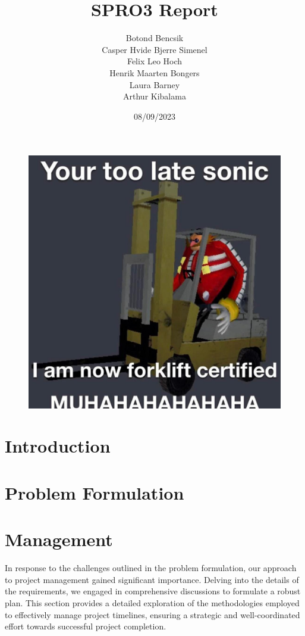 \documentclass[11pt,table]{article}
\title{SPRO3 Report}
\date{08/09/2023}
\author{Botond Bencsik\\Casper Hvide Bjerre Simenel\\Felix Leo Hoch\\Henrik Maarten Bongers\\Laura Barney\\Arthur Kibalama}
\begin{document}
\maketitle
\begin{figure}[H]
    \includegraphics[width=\textwidth]{forklift_m.jpg}
\end{figure}
\newpage
\tableofcontents
\newpage
\section{Introduction}
      
\section{Problem Formulation}
    
    
    

    
    
\section{Management}
    In response to the challenges outlined in the problem formulation, our approach
    to project management gained significant importance. Delving into the details
    of the requirements, we engaged in comprehensive discussions to formulate a
    robust plan. This section provides a detailed exploration of the methodologies
    employed to effectively manage project timelines, ensuring a strategic and
    well-coordinated effort towards successful project completion.
    
    
    
\end{document}
